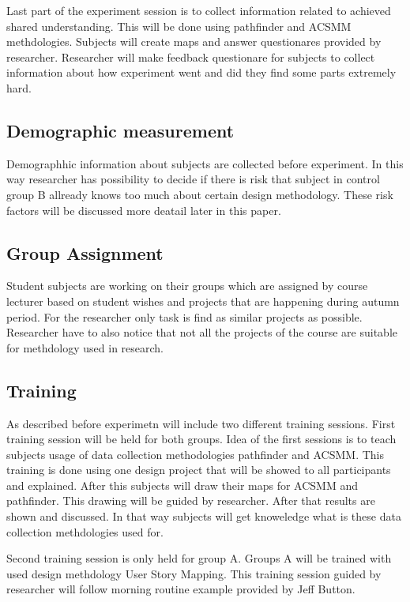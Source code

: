\documentclass[english]{tktltiki2}
\theoremstyle{definition}
\theoremstyle{remark}
\begin{document}
Last part of the experiment session is to collect information related to achieved shared understanding. This will be done using pathfinder and ACSMM methdologies. Subjects will create maps and answer questionares provided by researcher. Researcher will make feedback questionare for subjects to collect information about how experiment went and did they find some parts extremely hard.

\subsection{Demographic measurement}

Demographhic information about subjects are collected before experiment. In this way researcher has possibility to decide if there is risk that subject in control group B allready knows too much about certain design methodology. These risk factors will be discussed more deatail later in this paper.

\subsection{Group Assignment}

Student subjects are working on their groups which are assigned by course lecturer based on student wishes and projects that are happening during autumn period. For the researcher only task is find as similar projects as possible. Researcher have to also notice that not all the projects of the course are suitable for methdology used in research.

\subsection{Training}

As described before experimetn will include two different training sessions. First training session will be held for both groups. Idea of the first sessions is to teach subjects usage of data collection methodologies pathfinder and ACSMM. This training is done using one design project that will be showed to all participants and explained. After this subjects will draw their maps for ACSMM and pathfinder. This drawing will be guided by researcher. After that results are shown and discussed. In that way subjects will get knoweledge what is these data collection methdologies used for.

Second training session is only held for group A. Groups A will be trained with used design methdology User Story Mapping. This training session guided by researcher will follow morning routine example provided by Jeff Button\cite{userStoryMapping}. 
\end{document}
